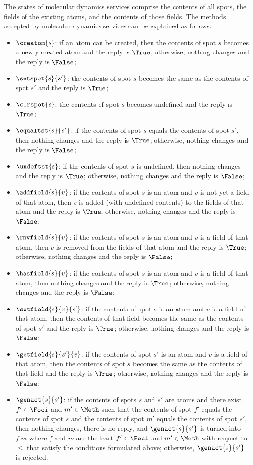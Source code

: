 \documentclass[fleqn]{llncs}
\begin{document}
The states of molecular dynamics services comprise the contents of all
spots, the fields of the existing atoms, and the contents of those
fields.
The methods accepted by molecular dynamics services can be explained as
follows:
\begin{itemize}
\item
$\creatom{s}$:
if an atom can be created, then the contents of spot $s$ becomes a newly
created atom and the reply is $\True$; otherwise, nothing changes and
the reply is $\False$;
\item
$\setspot{s}{s'}$:
the contents of spot $s$ becomes the same as the contents of spot $s'$
and the reply is $\True$;
\item
$\clrspot{s}$:
the contents of spot $s$ becomes undefined and the reply is $\True$;
\item
$\equaltst{s}{s'}$:
if the contents of spot $s$ equals the contents of spot $s'$, then
nothing changes and the reply is $\True$; otherwise, nothing changes and
the reply is $\False$;
\item
$\undeftst{s}$:
if the contents of spot $s$ is undefined, then nothing changes and the
reply is $\True$; otherwise, nothing changes and the reply is $\False$;
\item
$\addfield{s}{v}$:
if the contents of spot $s$ is an atom and $v$ is not yet a field of
that atom, then $v$ is added (with undefined contents) to the fields of
that atom and the reply is $\True$; otherwise, nothing changes and the
reply is $\False$;
\item
$\rmvfield{s}{v}$:
if the contents of spot $s$ is an atom and $v$ is a field of that atom,
then $v$ is removed from the fields of that atom and the reply is
$\True$; otherwise, nothing changes and the reply is $\False$;
\item
$\hasfield{s}{v}$:
if the contents of spot $s$ is an atom and $v$ is a field of that atom,
then nothing changes and the reply is $\True$; otherwise, nothing
changes and the reply is $\False$;
\item
$\setfield{s}{v}{s'}$:
if the contents of spot $s$ is an atom and $v$ is a field of that atom,
then the contents of that field becomes the same as the contents of spot
$s'$ and the reply is $\True$; otherwise, nothing changes and the reply
is $\False$;
\item
$\getfield{s}{s'}{v}$:
if the contents of spot $s'$ is an atom and $v$ is a field of that atom,
then the contents of spot $s$ becomes the same as the contents of that
field and the reply is $\True$; otherwise, nothing changes and the reply
is $\False$;
\item
$\genact{s}{s'}$:
if the contents of spots $s$ and $s'$ are atoms and there exist
$f' \in \Foci$ and  $m' \in \Meth$ such that the contents of spot $f'$
equals the contents of spot $s$ and the contents of spot $m'$ equals the
contents of spot $s'$, then nothing changes, there is no reply, and
$\genact{s}{s'}$ is turned into $f.m$ where $f$ and $m$ are the least
$f' \in \Foci$ and $m' \in \Meth$ with respect to $\leq$ that satisfy
the conditions formulated above; otherwise, $\genact{s}{s'}$ is
rejected.
\end{itemize}
\end{document}
